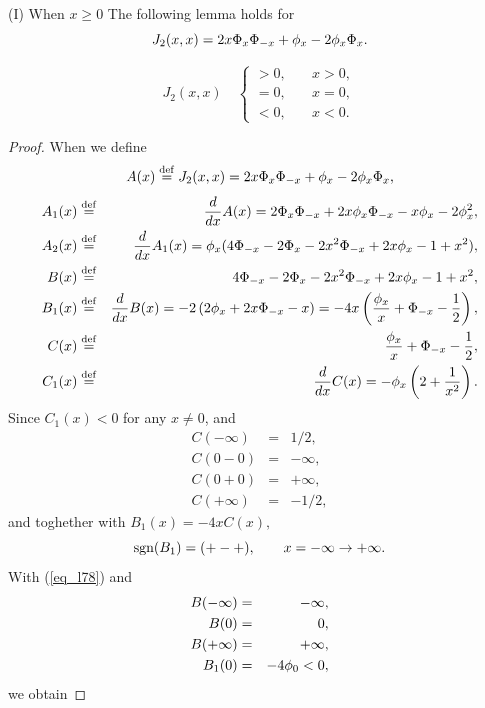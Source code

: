 \noindent (I) When $x \geq 0$
The following lemma holds for
\[
  J_2(x,x)=2 x \Phi_x \Phi_{-x} + \phi_x - 2\phi_x \Phi_x.
\]
\begin{lemma}\label{lem_l4}
\begin{equation}\label{eq_l77}
 J_2(x,x) \quad \left\{
 \begin{array}{ll}
 > 0, \quad & x>0, \\
 = 0, \quad & x=0, \\
 < 0, \quad & x<0.
 \end{array}
 \right.
\end{equation}
\end{lemma}
\begin{proof}
When we define
\[
 A(x) \stackrel{\mathrm{def}}{=} J_2(x,x) = 2x \Phi_x \Phi_{-x} + \phi_x - 2 \phi_x \Phi_x,
\]
\begin{eqnarray*}
 A_1(x) & \stackrel{\mathrm{def}}{=} & \frac{d }{d x}A(x) = 2 \Phi_x \Phi_{-x} + 2x \phi_x \Phi_{-x} - x \phi_x - 2 \phi_x^2, \\
 A_2(x) & \stackrel{\mathrm{def}}{=} & \frac{d }{d x}A_1(x) = \phi_x ( 4 \Phi_{-x} - 2 \Phi_x - 2 x^2 \Phi_{-x}+ 2 x \phi_x -1 + x^2), \\
 B(x) & \stackrel{\mathrm{def}}{=} &  4 \Phi_{-x} - 2 \Phi_x - 2 x^2 \Phi_{-x}+ 2 x \phi_x -1 + x^2, \\
 B_1(x) & \stackrel{\mathrm{def}}{=} & \frac{d }{d x}B(x)= -2 \left( 2 \phi_x + 2 x \Phi_{-x} - x \right)
             =      -4x \left( \frac{\phi_x}{x} + \Phi_{-x} - \frac{1}{2} \right), \\
 C(x) & \stackrel{\mathrm{def}}{=} & \frac{\phi_x}{x} + \Phi_{-x} - \frac{1}{2}, \\
 C_1(x) & \stackrel{\mathrm{def}}{=} & \frac{d }{d x}C(x) = - \phi_x \left( 2 + \frac{1}{x^2} \right).
\end{eqnarray*}
Since $C_1(x)<0$ for any $x \neq 0$, and
\begin{eqnarray*}
  C(-\infty) & = & 1/2, \\
  C(0-0) & = & -\infty, \\
  C(0+0) & = & +\infty, \\
  C(+\infty) & = & -1/2,
\end{eqnarray*}
and toghether with $B_1(x) = -4x C(x),$
\begin{equation}\label{eq_l78}
 \mbox{sgn}(B_1) = (+-+), \qquad x = -\infty \rightarrow +\infty.
\end{equation}
With (\ref{eq_l78}) and
\begin{eqnarray*}
  B(-\infty) & = & - \infty, \\
  B(0) & = & 0, \\
  B(+\infty) & = & + \infty, \\
  B_1(0) & = & -4 \p0 < 0,
\end{eqnarray*}
we obtain

\end{proof}
